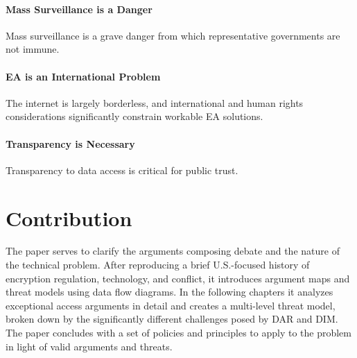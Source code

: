 \paragraph*{Mass Surveillance is a Danger} Mass surveillance is a grave danger from which representative governments are
not immune.

\paragraph*{\ac{EA} is an International Problem} The internet is largely borderless, and international and human rights
considerations significantly constrain workable \ac{EA} solutions.

\paragraph*{Transparency is Necessary} Transparency to data access is critical for public trust.


\section{Contribution}
\label{sec-contribution}

The paper serves to clarify the arguments composing debate and the nature of the technical problem. After reproducing a
brief U.S.-focused history of encryption regulation, technology, and conflict, it introduces argument maps and threat
models using data flow diagrams. In the following chapters it analyzes exceptional access arguments in detail and
creates a multi-level threat model, broken down by the significantly different challenges posed by \ac{DAR} and
\ac{DIM}. The paper concludes with a set of policies and principles to apply to the problem in light of valid arguments
and threats.
